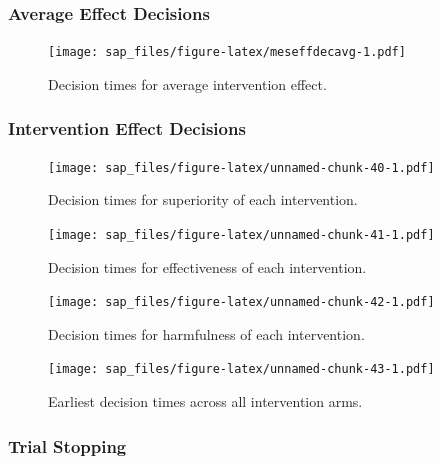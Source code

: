 \documentclass[
  bibliography=totoc]{scrreprt}
\begin{document}
\hypertarget{average-effect-decisions-3}{%
\subsubsection{Average Effect Decisions}\label{average-effect-decisions-3}}

\begin{figure}
\centering
\texttt{[image: sap\_files/figure-latex/meseffdecavg-1.pdf]}
\caption{\label{fig:meseffdecavg}Decision times for average intervention effect.}
\end{figure}

\clearpage

\hypertarget{intervention-effect-decisions-3}{%
\subsubsection{Intervention Effect Decisions}\label{intervention-effect-decisions-3}}

\begin{figure}
\centering
\texttt{[image: sap\_files/figure-latex/unnamed-chunk-40-1.pdf]}
\caption{\label{fig:unnamed-chunk-40}Decision times for superiority of each intervention.}
\end{figure}

\begin{figure}
\centering
\texttt{[image: sap\_files/figure-latex/unnamed-chunk-41-1.pdf]}
\caption{\label{fig:unnamed-chunk-41}Decision times for effectiveness of each intervention.}
\end{figure}

\begin{figure}
\centering
\texttt{[image: sap\_files/figure-latex/unnamed-chunk-42-1.pdf]}
\caption{\label{fig:unnamed-chunk-42}Decision times for harmfulness of each intervention.}
\end{figure}

\begin{figure}
\centering
\texttt{[image: sap\_files/figure-latex/unnamed-chunk-43-1.pdf]}
\caption{\label{fig:unnamed-chunk-43}Earliest decision times across all intervention arms.}
\end{figure}

\clearpage

\hypertarget{trial-stopping-3}{%
\subsubsection{Trial Stopping}\label{trial-stopping-3}}
\end{document}
